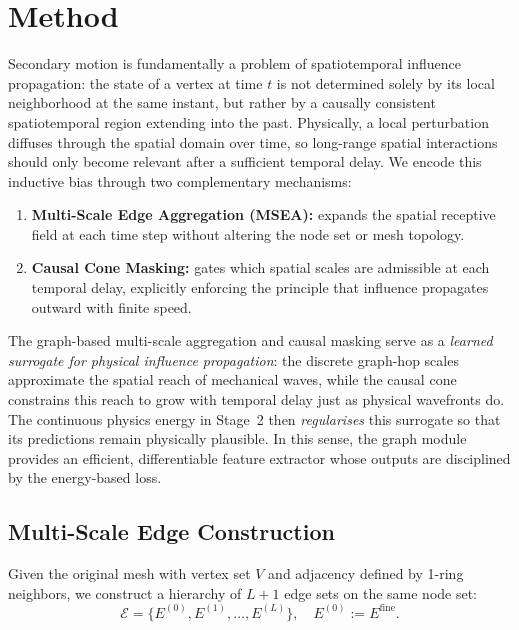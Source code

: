 \documentclass[10pt,twocolumn]{article}
\begin{document}
\section{Method}

Secondary motion is fundamentally a problem of spatiotemporal influence propagation: the state of a vertex at time $t$ is not determined solely by its local neighborhood at the same instant, but rather by a causally consistent spatiotemporal region extending into the past. Physically, a local perturbation diffuses through the spatial domain over time, so long-range spatial interactions should only become relevant after a sufficient temporal delay. We encode this inductive bias through two complementary mechanisms:
\begin{enumerate}
    \item \textbf{Multi-Scale Edge Aggregation (MSEA):} expands the spatial receptive field at each time step without altering the node set or mesh topology.
    \item \textbf{Causal Cone Masking:} gates which spatial scales are admissible at each temporal delay, explicitly enforcing the principle that influence propagates outward with finite speed.
\end{enumerate}

The graph-based multi-scale aggregation and causal masking serve as a \emph{learned surrogate for physical influence propagation}: the discrete graph-hop scales approximate the spatial reach of mechanical waves, while the causal cone constrains this reach to grow with temporal delay just as physical wavefronts do. The continuous physics energy in Stage~2 then \emph{regularises} this surrogate so that its predictions remain physically plausible. In this sense, the graph module provides an efficient, differentiable feature extractor whose outputs are disciplined by the energy-based loss.

\subsection{Multi-Scale Edge Construction}

Given the original mesh with vertex set $V$ and adjacency defined by 1-ring neighbors, we construct a hierarchy of $L+1$ edge sets on the same node set:
\begin{equation}
    \mathcal{E} = \{E^{(0)}, E^{(1)}, \dots, E^{(L)}\}, \quad E^{(0)} := E^{\mathrm{fine}}.
\end{equation}
\end{document}
